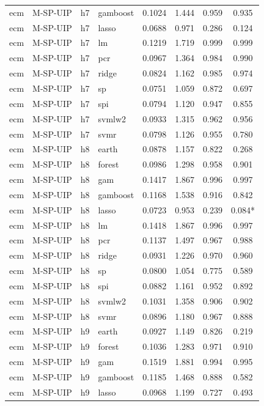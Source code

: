 \begin{ThreePartTable}
\begin{longtable}[t]{llclcccc}
ecm & M-SP-UIP & h7 & gamboost & 0.1024 & 1.444 & 0.959 & 0.935\\
ecm & M-SP-UIP & h7 & lasso & 0.0688 & 0.971 & 0.286 & 0.124\\
ecm & M-SP-UIP & h7 & lm & 0.1219 & 1.719 & 0.999 & 0.999\\
ecm & M-SP-UIP & h7 & pcr & 0.0967 & 1.364 & 0.984 & 0.990\\
ecm & M-SP-UIP & h7 & ridge & 0.0824 & 1.162 & 0.985 & 0.974\\
ecm & M-SP-UIP & h7 & sp & 0.0751 & 1.059 & 0.872 & 0.697\\
ecm & M-SP-UIP & h7 & spi & 0.0794 & 1.120 & 0.947 & 0.855\\
ecm & M-SP-UIP & h7 & svmlw2 & 0.0933 & 1.315 & 0.962 & 0.956\\
ecm & M-SP-UIP & h7 & svmr & 0.0798 & 1.126 & 0.955 & 0.780\\
\addlinespace
ecm & M-SP-UIP & h8 & earth & 0.0878 & 1.157 & 0.822 & 0.268\\
ecm & M-SP-UIP & h8 & forest & 0.0986 & 1.298 & 0.958 & 0.901\\
ecm & M-SP-UIP & h8 & gam & 0.1417 & 1.867 & 0.996 & 0.997\\
ecm & M-SP-UIP & h8 & gamboost & 0.1168 & 1.538 & 0.916 & 0.842\\
ecm & M-SP-UIP & h8 & lasso & 0.0723 & 0.953 & 0.239 & 0.084*\\
ecm & M-SP-UIP & h8 & lm & 0.1418 & 1.867 & 0.996 & 0.997\\
ecm & M-SP-UIP & h8 & pcr & 0.1137 & 1.497 & 0.967 & 0.988\\
ecm & M-SP-UIP & h8 & ridge & 0.0931 & 1.226 & 0.970 & 0.960\\
ecm & M-SP-UIP & h8 & sp & 0.0800 & 1.054 & 0.775 & 0.589\\
ecm & M-SP-UIP & h8 & spi & 0.0882 & 1.161 & 0.952 & 0.892\\
ecm & M-SP-UIP & h8 & svmlw2 & 0.1031 & 1.358 & 0.906 & 0.902\\
ecm & M-SP-UIP & h8 & svmr & 0.0896 & 1.180 & 0.967 & 0.888\\
\addlinespace
ecm & M-SP-UIP & h9 & earth & 0.0927 & 1.149 & 0.826 & 0.219\\
ecm & M-SP-UIP & h9 & forest & 0.1036 & 1.283 & 0.971 & 0.910\\
ecm & M-SP-UIP & h9 & gam & 0.1519 & 1.881 & 0.994 & 0.995\\
ecm & M-SP-UIP & h9 & gamboost & 0.1185 & 1.468 & 0.888 & 0.582\\
ecm & M-SP-UIP & h9 & lasso & 0.0968 & 1.199 & 0.727 & 0.493\\

\end{longtable}
\end{ThreePartTable}
